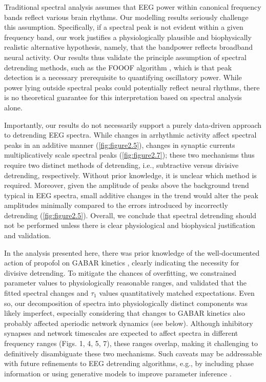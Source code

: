Traditional spectral analysis assumes that EEG power within canonical frequency bands reflect various brain rhythms. Our modelling results seriously challenge this assumption. Specifically, if a spectral peak is not evident within a given frequency band, our work justifies a physiologically plausible and biophysically realistic alternative hypothesis, namely, that the bandpower reflects broadband neural activity. Our results thus validate the principle assumption of spectral detrending methods, such as the FOOOF algorithm \cite{Donoghue2020}, which is that peak detection is a necessary prerequisite to quantifying oscillatory power. While power lying outside spectral peaks could potentially reflect neural rhythms, there is no theoretical guarantee for this interpretation based on spectral analysis alone. 

Importantly, our results do not necessarily support a purely data-driven approach to detrending EEG spectra. While changes in arrhythmic activity affect spectral peaks in an additive manner (\autoref{fig:figure2.5}), changes in synaptic currents multiplicatively scale spectral peaks (\autoref{fig:figure2.7}); these two mechanisms thus require two distinct methods of detrending, i.e., subtractive versus divisive detrending, respectively. Without prior knowledge, it is unclear which method is required. Moreover, given the amplitude of peaks above the background trend typical in EEG spectra, small additive changes in the trend would alter the peak amplitudes minimally compared to the errors introduced by incorrectly detrending (\autoref{fig:figure2.5}). Overall, we conclude that spectral detrending should not be performed unless there is clear physiological and biophysical justification and validation. 

In the analysis presented here, there was prior knowledge of the well-documented action of propofol on GABAR kinetics \cite{Kitamura2003, Orser1994, Whittington1996}, clearly indicating the necessity for divisive detrending. To mitigate the chances of overfitting, we constrained parameter values to physiologically reasonable ranges, and validated that the fitted spectral changes and $\tau_1$ values quantitatively matched expectations. Even so, our decomposition of spectra into physiologically distinct components was likely imperfect, especially considering that changes to GABAR kinetics also probably affected aperiodic network dynamics \cite{Li2020} (see below). Although inhibitory synapses and network timescales are expected to affect spectra in different frequency ranges (Figs. 1, 4, 5, 7), these ranges overlap, making it challenging to definitively disambiguate these two mechanisms. Such caveats may be addressable with future refinements to EEG detrending algorithms, e.g., by including phase information or using generative models to improve parameter inference \cite{Zeraati2022}. 

